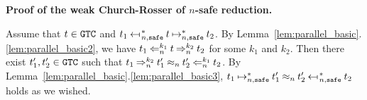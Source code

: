 \noindent\textbf{Proof of the weak Church-Rosser of $n$-safe reduction.}

Assume that $t\in {\tt GTC}$ and $t_1 \nsafeReducesAstL{n} t \nsafeReducesAst{n} t_2$. 
By Lemma~\ref{lem:parallel_basic}.\ref{lem:parallel_basic2},
we have $t_1 \mathbin{\Leftarrow_{n}^{k_1}} t \mathbin{\Rightarrow_{n}^{k_2}} t_2$ for some $k_1$ and $k_2$.
Then there exist $t_1', t_2' \in {\tt GTC}$ such that
$t_1 \mathbin{\Rightarrow_{n}^{k_2}} t_1' \mathbin{\approx_{n}} t_2' \mathbin{\Leftarrow_{n}^{k_1}} t_2$.
By Lemma~\ref{lem:parallel_basic}.\ref{lem:parallel_basic3},
$t_1 \nsafeReducesAst{n} t'_1 \nequal{n} t'_2 \nsafeReducesAstL{n} t_2$ holds as we wished.


